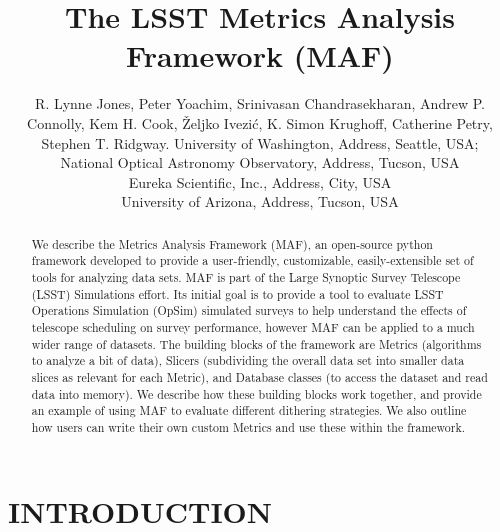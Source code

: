 \documentclass[]{spie}  %
\title{The LSST Metrics Analysis Framework (MAF)}
\author{R. Lynne Jones\supit{a}, Peter Yoachim\supit{a}, Srinivasan
  Chandrasekharan\supit{b}, Andrew P. Connolly\supit{a}, Kem
  H. Cook\supit{c}, {\v Z}eljko Ivezi{\'c}\supit{a},  K. Simon Krughoff\supit{a}, Catherine Petry\supit{d}, Stephen T. Ridgway\supit{b}.
\skiplinehalf
\supit{a}University of Washington, Address, Seattle, USA; \\
\supit{b}National Optical Astronomy Observatory, Address, Tucson,
USA\\
\supit{c}Eureka Scientific, Inc., Address, City, USA\\
\supit{d}University of Arizona, Address, Tucson, USA\\
}
\begin{document}
 

  \maketitle 



\begin{abstract}
We describe the Metrics Analysis Framework (MAF), an open-source
python framework developed to provide a user-friendly, customizable,
easily-extensible set of tools for analyzing data sets. MAF is part of
the Large Synoptic Survey Telescope (LSST) Simulations effort. Its
initial goal is to provide a tool to evaluate LSST Operations
Simulation (OpSim) simulated surveys to help understand the effects of
telescope scheduling on survey performance, however MAF can be applied
to a much wider range of datasets. The building blocks of the
framework are Metrics (algorithms to analyze a bit of data), Slicers
(subdividing the overall data set into smaller data slices as relevant
for each Metric), and Database classes (to access the dataset and read
data into memory). We describe how these building blocks work
together, and provide an example of using MAF to evaluate different
dithering strategies. We also outline how users can write their own
custom Metrics and use these within the framework. 
\end{abstract}


\section{INTRODUCTION}
\label{sec:intro}  
\end{document}
